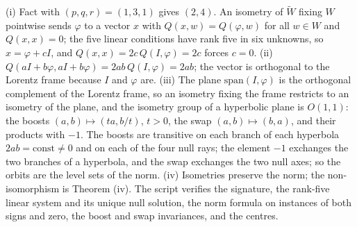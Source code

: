 (i) Fact  with $(p,q,r) = (1,3,1)$ gives $(2,4)$. An isometry of $\widetilde W$ fixing $W$ pointwise sends $\varphi$ to a vector $x$ with $Q(x, w) = Q(\varphi, w)$ for all $w \in W$ and $Q(x,x) = 0$; the five linear conditions have rank five in six unknowns, so $x = \varphi + cI$, and $Q(x,x) = 2c\,Q(I,\varphi) = 2c$ forces $c = 0$. (ii) $Q(aI + b\varphi, aI + b\varphi) = 2ab\,Q(I,\varphi) = 2ab$; the vector is orthogonal to the Lorentz frame because $I$ and $\varphi$ are. (iii) The plane $\mathrm{span}(I,\varphi)$ is the orthogonal complement of the Lorentz frame, so an isometry fixing the frame restricts to an isometry of the plane, and the isometry group of a hyperbolic plane is $O(1,1)$: the boosts $(a,b) \mapsto (ta, b/t)$, $t > 0$, the swap $(a,b) \mapsto (b,a)$, and their products with $-1$. The boosts are transitive on each branch of each hyperbola $2ab = \text{const} \neq 0$ and on each of the four null rays; the element $-1$ exchanges the two branches of a hyperbola, and the swap exchanges the two null axes; so the orbits are the level sets of the norm. (iv) Isometries preserve the norm; the non-isomorphism is Theorem (iv). The script verifies the signature, the rank-five linear system and its unique null solution, the norm formula on instances of both signs and zero, the boost and swap invariances, and the centres.
